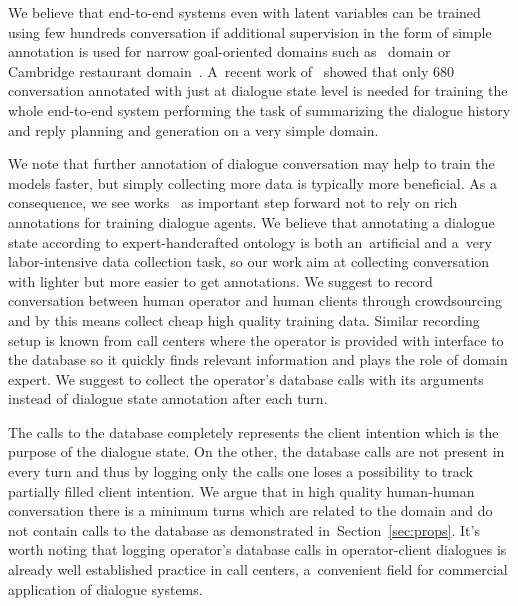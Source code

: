 \documentclass[runningheads,a4paper]{llncs}
\begin{document}
We believe that end-to-end systems even with latent variables can be trained using few hundreds conversation if additional supervision in the form of simple annotation is used for narrow goal-oriented domains such as~\cite{wen2016network} domain or Cambridge restaurant domain~\cite{henderson2014dstc2}.
A~recent work of~\cite{wen2016network} showed that only 680 conversation annotated with just at dialogue state level is needed for training the whole end-to-end system performing the task of summarizing the dialogue history and reply planning and generation on a very simple domain.

We note that further annotation of dialogue conversation may help to train the models faster, but simply collecting more data is typically more beneficial.
As a consequence, we see works~\cite{wen2016network,bordes2016learning,williams2016end} as important step forward not to rely on rich annotations for training dialogue agents.
We believe that annotating a dialogue state according to expert-handcrafted ontology is both an~artificial and a~very labor-intensive data collection task, so our work aim at collecting conversation with lighter but more easier to get annotations.
We suggest to record conversation between human operator and human clients through crowdsourcing and by this means collect cheap high quality training data.
Similar recording setup is known from call centers where the operator is provided with interface to the database so it quickly finds relevant information and plays the role of domain expert.
We suggest to collect the operator's database calls with its arguments instead of dialogue state annotation after each turn.

The calls to the database completely represents the client intention which is the purpose of the dialogue state.
On the other, the database calls are not present in every turn and thus by logging only the calls one loses a possibility to track partially filled client intention.
We argue that in high quality human-human conversation there is a minimum turns which are related to the domain and do not contain calls to the database as demonstrated in~Section~\ref{sec:props}.
It's worth noting that logging operator's database calls in operator-client dialogues is already well established practice in call centers, a~convenient field for commercial application of dialogue systems.
\end{document}
